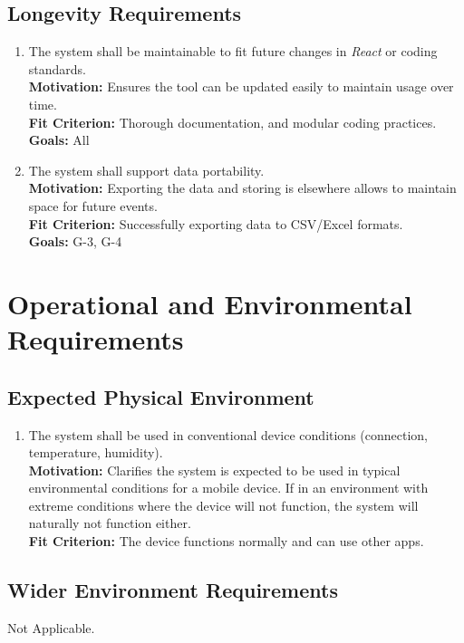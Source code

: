 \documentclass[12pt]{article}
\begin{document}
\subsection{Longevity Requirements}
\begin{enumerate}[label=\bfseries LG-\arabic*:, wide=0pt, leftmargin=*, ref=\bfseries LG-\arabic*]
  \item \label{LG1} The system shall be maintainable to fit future changes in \textit{React} or coding standards.\\
    {\bf Motivation:} Ensures the tool can be updated easily to maintain usage over time.\\
    {\bf Fit Criterion:} Thorough documentation, and modular coding practices.\\
    {\bf Goals:} All
  \item \label{LG2} The system shall support data portability.\\
    {\bf Motivation:} Exporting the data and storing is elsewhere allows to maintain space for future events.\\
    {\bf Fit Criterion:} Successfully exporting data to CSV/Excel formats.\\
    {\bf Goals:} G-3, G-4
\end{enumerate}

\section{Operational and Environmental Requirements}
\subsection{Expected Physical Environment}
\begin{enumerate}[label=\bfseries PE-\arabic*:, wide=0pt, leftmargin=*]
  \item The system shall be used in conventional device conditions (connection, temperature, humidity).\\
    {\bf Motivation:} Clarifies the system is expected to be used in typical environmental conditions for a mobile device. If in an environment with extreme conditions where the device will not function, the system will naturally not function either.\\
    {\bf Fit Criterion:} The device functions normally and can use other apps.\\
\end{enumerate}

\subsection{Wider Environment Requirements}
Not Applicable.
\end{document}
